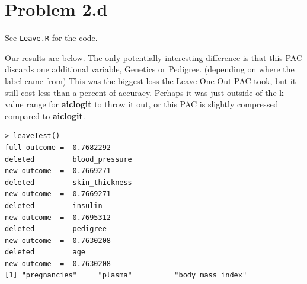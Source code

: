 \documentclass[letter]{article}
\begin{document}

\section*{Problem 2.d}

See \texttt{Leave.R} for the code.

Our results are below. The only potentially interesting difference is that this PAC discards one additional variable, Genetics or Pedigree. (depending on where the label came from) This was the biggest loss the Leave-One-Out PAC took, but it still cost less than a percent of accuracy. Perhaps it was just outside of the  k-value range for \textbf{aiclogit} to throw it out, or this PAC is slightly compressed compared to \textbf{aiclogit}.

\begin{verbatim}
> leaveTest()
full outcome =  0.7682292 
deleted         blood_pressure 
new outcome  =  0.7669271 
deleted         skin_thickness 
new outcome  =  0.7669271 
deleted         insulin 
new outcome  =  0.7695312 
deleted         pedigree 
new outcome  =  0.7630208 
deleted         age 
new outcome  =  0.7630208 
[1] "pregnancies"     "plasma"          "body_mass_index"
\end{verbatim}




\end{document}
